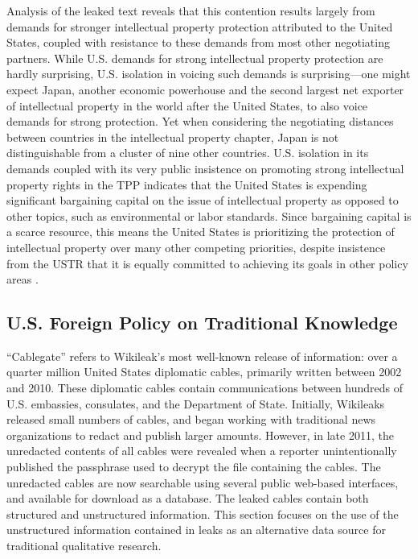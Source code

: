 \documentclass[12pt]{article}
\begin{document}
Analysis of the leaked text reveals that this contention results largely from demands for stronger intellectual 
property protection attributed to the United States, 
coupled with resistance to these demands from most other negotiating partners. While U.S. demands for 
strong intellectual property protection are hardly surprising, U.S. isolation in voicing such demands 
is surprising---one might expect Japan, another economic powerhouse and the second largest net exporter of 
intellectual property in the world after the United States, to also voice demands for strong protection. Yet when 
considering the negotiating distances between countries in the intellectual property chapter, Japan 
is not distinguishable from a cluster of nine other countries. U.S. isolation in its demands coupled with 
its very public insistence on promoting strong intellectual property rights in the TPP indicates that the 
United States is expending significant bargaining capital on the issue of intellectual property as opposed to 
other topics, such as environmental or labor standards. Since bargaining capital is a scarce resource, this 
means the United States is prioritizing the protection of intellectual property over many other competing priorities, 
despite insistence from the USTR that it is equally committed to 
achieving its goals in other policy areas \citep{u.s._trade_representative????trans-pacific}. 

\subsection{U.S. Foreign Policy on Traditional Knowledge}
\label{tk}

``Cablegate'' refers to Wikileak's most well-known release of information: over a quarter million 
United States diplomatic cables, primarily written between 2002 and 2010. These diplomatic cables 
contain communications between hundreds of U.S. embassies, consulates, and the Department of State. 
Initially, Wikileaks released small numbers of cables, and began working with traditional news 
organizations to redact and publish larger amounts. However, in late 2011, the unredacted 
contents of all cables were revealed when a reporter unintentionally published the passphrase used 
to decrypt the file containing the cables. The unredacted cables are now searchable 
using several public web-based interfaces, and available for download as a database. 
The leaked cables contain both structured and unstructured information. 
This section focuses on the use of the unstructured information contained in leaks as an alternative 
data source for traditional qualitative research.
\end{document}

